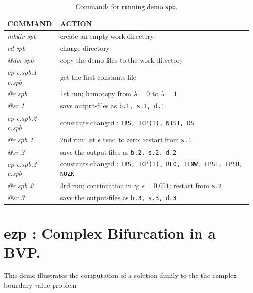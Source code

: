 \documentclass[12pt]{report}
\def\eps{\epsilon}
\begin{document}
\begin{table}[htbp]
\begin{center}
\begin{tabular}{| l | l |}
\hline
  COMMAND  & ACTION \\
\hline
  {\it mkdir spb} & create an empty work directory \\ 
  {\it cd spb} & change directory \\
  {\it @dm spb} & copy the demo files to the work directory \\
\hline
  {\it cp c.spb.1 c.spb} & get the first constants-file \\ 
  {\it @r spb} & 1st run; homotopy from $\lambda=0$ to $\lambda=1$ \\ 
  {\it @sv 1} & save output-files as {\tt b.1, s.1, d.1} \\ 
\hline
  {\it cp c.spb.2 c.spb} & constants changed : {\tt IRS, ICP(1), NTST, DS} \\ 
  {\it @r spb 1} & 2nd run; let $\eps$ tend to zero; restart from {\tt s.1} \\ 
  {\it @sv 2} & save the output-files as {\tt b.2, s.2, d.2} \\ 
\hline
  {\it cp c.spb.3 c.spb} & constants changed : {\tt IRS, ICP(1), RL0, ITNW, EPSL, EPSU, NUZR} \\ 
  {\it @r spb 2} & 3rd run; continuation in $\gamma$; $\eps=0.001$; restart from {\tt s.2} \\ 
  {\it @sv 3} & save the output-files as {\tt b.3, s.3, d.3} \\ 
\hline
\end{tabular}
\caption{Commands for running demo {\tt spb}.}
\label{tbl:demo_spb}
\end{center}
\end{table}

\newpage
\section{ ezp : Complex Bifurcation in a BVP.} \label{sec:Demos_ezp}
This demo illustrates the computation of a solution family to
the the complex boundary value problem
\end{document}
